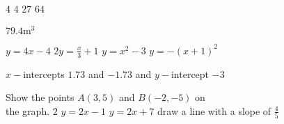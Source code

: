 \begin{Answer}[ref={ex12}]%

\Question %
\begin{tasks}
	\task 	 $4$
	\task    $4$	
	\task 	 $27$
	\task    $64$
\end{tasks}

\Question $79.4 \mathrm{m}^{3}$

\Question %
\begin{tasks}
	\task 	 $y=4x-4$
	\task    $2y=\frac{x}{3}+1$	
	\task 	 $y =x^{2} -3$ 
	\task    $y =-(x+1)^{2}$ 
\end{tasks}

\Question %
$x-$intercepts $1.73$ and $ -1.73$ and $y-$intercept $ -3$

\Question %
\begin{tasks}
\task 	 Show the points $A \left (3 ,5\right )$ and $B \left ( -2 , -5\right )$ on\\ the graph.%
\task    $2$	
\task 	$y =2 x -1$ 
\task  $y =2 x +7$
\task  draw a line with a slope of $\frac{4}{5}$
\end{tasks}


\end{Answer}
